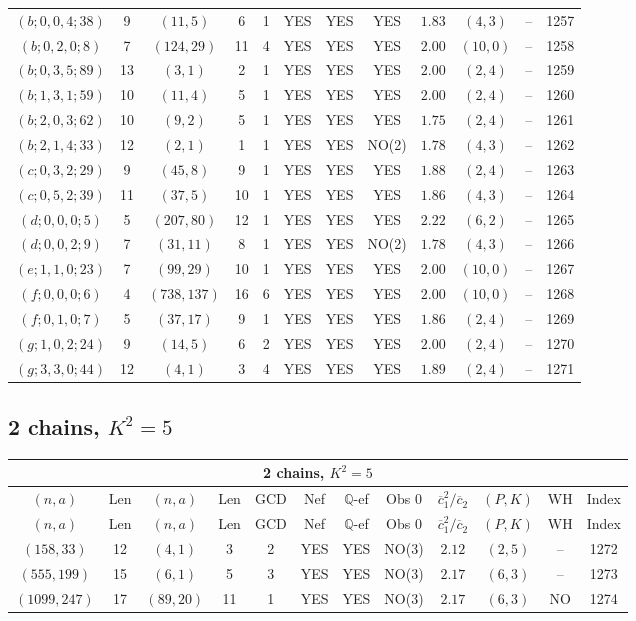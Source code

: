 \begin{longtable}{|c|c|c|c|c|c|c|c|c|c|c|c|}
$(b;0,0,4;38)$ & 9 & $(11,5)$ & 6 & 1 & YES & YES & YES & $1.83$ & $(4,3)$ & -- & 1257\\
$(b;0,2,0;8)$ & 7 & $(124,29)$ & 11 & 4 & YES & YES & YES & $2.00$ & $(10,0)$ & -- & 1258\\
$(b;0,3,5;89)$ & 13 & $(3,1)$ & 2 & 1 & YES & YES & YES & $2.00$ & $(2,4)$ & -- & 1259\\
$(b;1,3,1;59)$ & 10 & $(11,4)$ & 5 & 1 & YES & YES & YES & $2.00$ & $(2,4)$ & -- & 1260\\
$(b;2,0,3;62)$ & 10 & $(9,2)$ & 5 & 1 & YES & YES & YES & $1.75$ & $(2,4)$ & -- & 1261\\
$(b;2,1,4;33)$ & 12 & $(2,1)$ & 1 & 1 & YES & YES & NO(2) & $1.78$ & $(4,3)$ & -- & 1262\\
$(c;0,3,2;29)$ & 9 & $(45,8)$ & 9 & 1 & YES & YES & YES & $1.88$ & $(2,4)$ & -- & 1263\\
$(c;0,5,2;39)$ & 11 & $(37,5)$ & 10 & 1 & YES & YES & YES & $1.86$ & $(4,3)$ & -- & 1264\\
$(d;0,0,0;5)$ & 5 & $(207,80)$ & 12 & 1 & YES & YES & YES & $2.22$ & $(6,2)$ & -- & 1265\\
$(d;0,0,2;9)$ & 7 & $(31,11)$ & 8 & 1 & YES & YES & NO(2) & $1.78$ & $(4,3)$ & -- & 1266\\
$(e;1,1,0;23)$ & 7 & $(99,29)$ & 10 & 1 & YES & YES & YES & $2.00$ & $(10,0)$ & -- & 1267\\
$(f;0,0,0;6)$ & 4 & $(738,137)$ & 16 & 6 & YES & YES & YES & $2.00$ & $(10,0)$ & -- & 1268\\
$(f;0,1,0;7)$ & 5 & $(37,17)$ & 9 & 1 & YES & YES & YES & $1.86$ & $(2,4)$ & -- & 1269\\
$(g;1,0,2;24)$ & 9 & $(14,5)$ & 6 & 2 & YES & YES & YES & $2.00$ & $(2,4)$ & -- & 1270\\
$(g;3,3,0;44)$ & 12 & $(4,1)$ & 3 & 4 & YES & YES & YES & $1.89$ & $(2,4)$ & -- & 1271
\end{longtable}
\subsection{2 chains, $K^2 = 5$}
\begin{longtable}{|c|c|c|c|c|c|c|c|c|c|c|c|}
\hline
\multicolumn{12}{|c|}{2 chains, $K^2 = 5$}\\
\hline
$(n,a)$ & Len & $(n,a)$ & Len & GCD & Nef & $\mathbb Q$-ef & Obs 0 & $\overline c_1^2 / \overline c_2$ & $(P,K)$ & WH & Index\\
\hline
\endfirsthead

\hline
$(n,a)$ & Len & $(n,a)$ & Len & GCD & Nef & $\mathbb Q$-ef & Obs 0 & $\overline c_1^2 / \overline c_2$ & $(P,K)$ & WH & Index\\
\hline
\endhead
\hline
\endfoot

$(158,33)$ & 12 & $(4,1)$ & 3 & 2 & YES & YES & NO(3) & $2.12$ & $(2,5)$ & -- & 1272\\
$(555,199)$ & 15 & $(6,1)$ & 5 & 3 & YES & YES & NO(3) & $2.17$ & $(6,3)$ & -- & 1273\\
$(1099,247)$ & 17 & $(89,20)$ & 11 & 1 & YES & YES & NO(3) & $2.17$ & $(6,3)$ & NO & 1274
\end{longtable}
